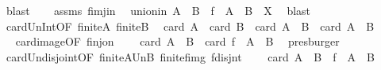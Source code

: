 \begin{isabellebody}
\ blast\isanewline
\ \ \isamarkupfalse%
\ assms{\isacharparenleft}{\kern0pt}{}{\isacharparenright}{\kern0pt}\ f{\isacharunderscore}{\kern0pt}imj{\isacharunderscore}{\kern0pt}in\ \isamarkupfalse%
\ union{\isacharunderscore}{\kern0pt}in{\isacharcolon}{\kern0pt}\ {\isachardoublequoteopen}{\isacharparenleft}{\kern0pt}A\ {\isasymunion}\ B{\isacharparenright}{\kern0pt}\ {\isasymunion}\ f\ {\isacharbackquote}{\kern0pt}\ {\isacharparenleft}{\kern0pt}A\ {\isasyminter}\ B{\isacharparenright}{\kern0pt}\ {\isasymsubseteq}\ X{\isachardoublequoteclose}\ \isamarkupfalse%
\ blast\isanewline
\ \ \isanewline
\ \ \isamarkupfalse%
\ card{\isacharunderscore}{\kern0pt}Un{\isacharunderscore}{\kern0pt}Int{\isacharbrackleft}{\kern0pt}OF\ finite{\isacharunderscore}{\kern0pt}A\ finite{\isacharunderscore}{\kern0pt}B{\isacharbrackright}{\kern0pt}\ \isamarkupfalse%
\ {\isachardoublequoteopen}card\ A\ {\isacharplus}{\kern0pt}\ card\ B\ {\isacharequal}{\kern0pt}\ card\ {\isacharparenleft}{\kern0pt}A\ {\isasymunion}\ B{\isacharparenright}{\kern0pt}\ {\isacharplus}{\kern0pt}\ card\ {\isacharparenleft}{\kern0pt}A\ {\isasyminter}\ B{\isacharparenright}{\kern0pt}{\isachardoublequoteclose}\ \isacommand{{\isachardot}{\kern0pt}}\isamarkupfalse%
\isanewline
\ \ \isamarkupfalse%
\ \isamarkupfalse%
\ card{\isacharunderscore}{\kern0pt}image{\isacharbrackleft}{\kern0pt}OF\ f{\isacharunderscore}{\kern0pt}inj{\isacharunderscore}{\kern0pt}on{\isacharbrackright}{\kern0pt}\ \isamarkupfalse%
\ {\isachardoublequoteopen}{\isachardot}{\kern0pt}{\isachardot}{\kern0pt}{\isachardot}{\kern0pt}\ {\isacharequal}{\kern0pt}\ card\ {\isacharparenleft}{\kern0pt}A\ {\isasymunion}\ B{\isacharparenright}{\kern0pt}\ {\isacharplus}{\kern0pt}\ card\ {\isacharparenleft}{\kern0pt}f\ {\isacharbackquote}{\kern0pt}\ {\isacharparenleft}{\kern0pt}A\ {\isasyminter}\ B{\isacharparenright}{\kern0pt}{\isacharparenright}{\kern0pt}{\isachardoublequoteclose}\ \isamarkupfalse%
\ presburger\isanewline
\ \ \isamarkupfalse%
\ \isamarkupfalse%
\ card{\isacharunderscore}{\kern0pt}Un{\isacharunderscore}{\kern0pt}disjoint{\isacharbrackleft}{\kern0pt}OF\ finite{\isacharunderscore}{\kern0pt}A{\isacharunderscore}{\kern0pt}Un{\isacharunderscore}{\kern0pt}B\ finite{\isacharunderscore}{\kern0pt}f{\isacharunderscore}{\kern0pt}img\ f{\isacharunderscore}{\kern0pt}disjnt{\isacharbrackright}{\kern0pt}\ \isamarkupfalse%
\ {\isachardoublequoteopen}{\isachardot}{\kern0pt}{\isachardot}{\kern0pt}{\isachardot}{\kern0pt}\ {\isacharequal}{\kern0pt}\ card\ {\isacharparenleft}{\kern0pt}{\isacharparenleft}{\kern0pt}A\ {\isasymunion}\ B{\isacharparenright}{\kern0pt}\ {\isasymunion}\ f\ {\isacharbackquote}{\kern0pt}\ {\isacharparenleft}{\kern0pt}A\ {\isasyminter}\ B{\isacharparenright}{\kern0pt}{\isacharparenright}{\kern0pt}{\isachardoublequoteclose}\ \isamarkupfalse%

\end{isabellebody}
